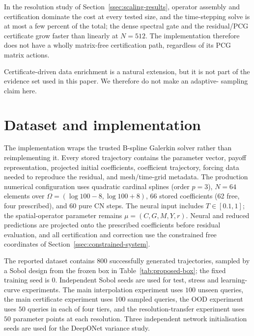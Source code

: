 \documentclass[11pt]{amsart}
\theoremstyle{remark}
\begin{document}
In the resolution study of Section~\ref{ssec:scaling-results}, operator
assembly and certification dominate the cost at every tested size, and the
time-stepping solve is at most a few percent of the total; the dense spectral
gate and the residual/PCG certificate grow faster than linearly at $N=512$.
The implementation therefore does not have a wholly matrix-free certification
path, regardless of its PCG matrix actions.

Certificate-driven data enrichment is a natural extension, but it is not part
of the evidence set used in this paper.  We therefore do not make an adaptive-
sampling claim here.

\section{Dataset and implementation}
\label{sec:data}

The implementation wraps the trusted B-spline Galerkin solver rather than
reimplementing it.  Every stored trajectory contains the parameter vector,
payoff representation, projected initial coefficients, coefficient trajectory,
forcing data needed to reproduce the residual, and mesh/time-grid metadata.
The production numerical configuration uses quadratic cardinal splines
(order $p=3$), $N=64$ elements over
$\Omega=(\log100-8,\log100+8)$, 66 stored coefficients (62 free, four
prescribed), and 60 pure CN steps. The neural input includes $T\in[0.1,1]$;
the spatial-operator parameter remains $\mu=(C,G,M,Y,r)$.
Neural and reduced predictions are projected onto the prescribed coefficients
before residual evaluation, and all certification and correction use the
constrained free coordinates of Section~\ref{ssec:constrained-system}.


The reported dataset contains $800$ successfully generated trajectories,
sampled by a Sobol design from the frozen box in
Table~\ref{tab:proposed-box}; the fixed training seed is $0$.  Independent
Sobol seeds are used for test, stress and learning-curve experiments.  The
main interpolation experiment uses $100$ unseen queries, the main
certificate experiment uses $100$ sampled queries, the OOD experiment uses
$50$ queries in each of four tiers, and the resolution-transfer experiment
uses $50$ parameter points at each resolution.  Three independent network
initialisation seeds are used for the DeepONet variance study.
\end{document}
